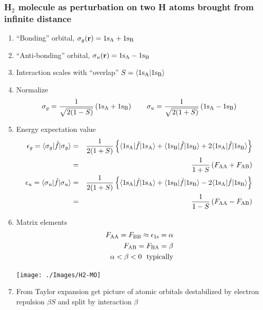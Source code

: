 \documentclass[11pt]{article}
\begin{document}
\subsubsection{H\(_2\) molecule as perturbation on two H atoms brought from infinite distance}
\label{sec:org46293cf}
\begin{enumerate}
\item ``Bonding'' orbital, \(\sigma_g({\bf r}) = 1{\rm s_A}+1{\rm s_B}\)
\item ``Anti-bonding'' orbital, \(\sigma_u({\bf r}) = 1{\rm s_A}-1{\rm s_B}\)
\item Interaction scales with ``overlap'' \(S = \langle 1{\rm s_A} | 1{\rm
            s_B} \rangle\)
\item Normalize
\begin{displaymath}
\sigma_g = \frac{1}{\sqrt{2(1-S)}}\left ( 1{\rm s_A}+1{\rm s_B} \right)     \quad\quad
\sigma_u = \frac{1}{\sqrt{2(1+S)}}\left ( 1{\rm s_A}-1{\rm s_B} \right)
\end{displaymath}
\item Energy expectation value
\begin{eqnarray*}
\epsilon_g = \langle \sigma_g | \hat{f} | \sigma_g \rangle & = & \frac{1}{2(1+S)} \left \{ \langle 1{\rm s_A} | \hat{f} | 1{\rm s_A} \rangle +  \langle 1{\rm s_B} | \hat{f} | 1{\rm s_B} \rangle + 2 \langle 1{\rm s_A} | \hat{f} |1{\rm s_B} \rangle \right \}\\
& = & \frac{1}{1+S} \left ( F_{\rm AA} + F_{\rm AB} \right ) \\
\epsilon_u = \langle \sigma_u | \hat{f} | \sigma_u \rangle & = & \frac{1}{2(1+S)} \left \{ \langle 1{\rm s_A} | \hat{f} | 1{\rm s_A} \rangle + \langle 1{\rm s_B} | \hat{f} | 1{\rm s_B} \rangle - 2 \langle 1{\rm s_A} | \hat{f} | 1{\rm s_B} \rangle\right \}\\
& = & \frac{1}{1-S} \left ( F_{\rm AA} - F_{\rm AB} \right )
\end{eqnarray*}
\item Matrix elements
\begin{eqnarray*}
	F_{\rm AA}=F_{\rm BB}\approx \epsilon_{1\mathrm{s}}=\alpha \\
	F_{\rm AB}=F_{\rm BA}=\beta \\
	\alpha < \beta < 0\ \ \mathrm{typically}
\end{eqnarray*}
\begin{center}
\texttt{[image: ./Images/H2-MO]}       
\end{center}
\item From Taylor expansion get picture of atomic orbitals destabilized by electron repulsion \(\beta S\) and split by interaction \(\beta\)

\end{enumerate}
\end{document}
